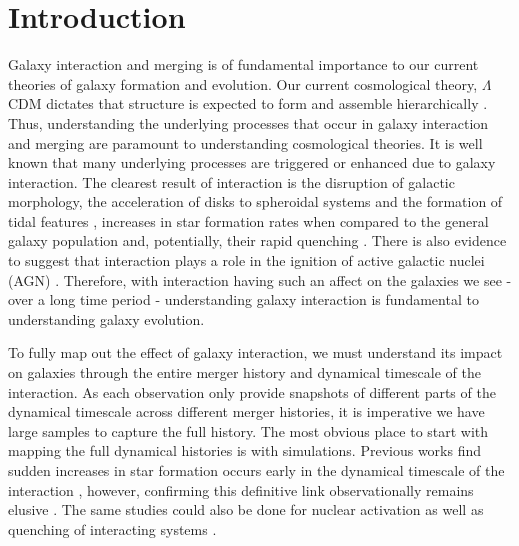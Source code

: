 \section{Introduction}\label{introduction}
\noindent Galaxy interaction and merging is of fundamental importance to our current theories of galaxy formation and evolution. Our current cosmological theory, $\Lambda$CDM dictates that structure is expected to form and assemble hierarchically \citep{1978MNRAS.183..341W, 2001MNRAS.328..726S, 2013MNRAS.436.1765M}. Thus, understanding the underlying processes that occur in galaxy interaction and merging are paramount to understanding cosmological theories. It is well known that many underlying processes are triggered or enhanced due to galaxy interaction. The clearest result of interaction is the disruption of galactic morphology, the acceleration of disks to spheroidal systems and the formation of tidal features \citep{1972ApJ...178..623T, 1977ApJ...212..616T, 2005MNRAS.357..753G, 2009MNRAS.397..802H}, increases in star formation rates when compared to the general galaxy population \citep{1991ApJ...370L..65B, 2006ApJ...652...56B, 2014MNRAS.437.2137S, 2015ApJ...807L..16K} and, potentially, their rapid quenching \citep{2013MNRAS.430.1901H, 2023RAA....23i5026D}. There is also evidence to suggest that interaction plays a role in the ignition of active galactic nuclei (AGN) \citep{2011MNRAS.418.2043E, 2015ApJ...806..219C, 2023MNRAS.523.4164H}. Therefore, with interaction having such an affect on the galaxies we see - over a long time period - understanding galaxy interaction is fundamental to understanding galaxy evolution.

To fully map out the effect of galaxy interaction, we must understand its impact on galaxies through the entire merger history and dynamical timescale of the interaction. As each observation only provide snapshots of different parts of the dynamical timescale across different merger histories, it is imperative we have large samples to capture the full history. The most obvious place to start with mapping the full dynamical histories is with simulations. Previous works find sudden increases in star formation occurs early in the dynamical timescale of the interaction \citep{2008MNRAS.384..386C, 2019MNRAS.490.2139R}, however, confirming this definitive link observationally remains elusive \citep{2023ApJ...958...96R}. The same studies could also be done for nuclear activation as well as quenching of interacting systems \citep{2011MNRAS.418.2043E, 2018PASJ...70S..37G, 2023ApJ...942..107S}. 

